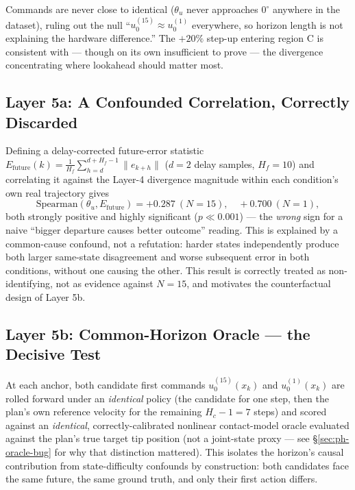 \documentclass[journal]{IEEEtran}
\begin{document}
Commands are never close to identical ($\theta_u$ never approaches
$0^{\circ}$ anywhere in the dataset), ruling out the null
``$u_0^{(15)}\approx u_0^{(1)}$ everywhere, so horizon length is not
explaining the hardware difference.'' The $+20\%$ step-up entering
region C is consistent with --- though on its own insufficient to
prove --- the divergence concentrating where lookahead should matter
most.

\subsection{Layer 5a: A Confounded Correlation, Correctly Discarded}
\label{sec:ph-5a}

Defining a delay-corrected future-error statistic
$E_{\mathrm{future}}(k) = \tfrac{1}{H_f}\sum_{h=d}^{d+H_f-1}\|e_{k+h}\|$
($d{=}2$ delay samples, $H_f{=}10$) and correlating it against the
Layer-4 divergence magnitude within each condition's own real
trajectory gives
\begin{equation}
\mathrm{Spearman}(\theta_u, E_{\mathrm{future}}) = +0.287\ (N{=}15),
\quad +0.700\ (N{=}1),
\end{equation}
both strongly positive and highly significant ($p\ll 0.001$) --- the
\emph{wrong} sign for a naive ``bigger departure causes better
outcome'' reading. This is explained by a common-cause confound,
not a refutation: harder states independently produce both larger
same-state disagreement and worse subsequent error in both
conditions, without one causing the other. This result is correctly
treated as non-identifying, not as evidence against $N{=}15$, and
motivates the counterfactual design of Layer 5b.

\subsection{Layer 5b: Common-Horizon Oracle --- the Decisive Test}
\label{sec:ph-5b}

At each anchor, both candidate first commands $u_0^{(15)}(x_k)$ and
$u_0^{(1)}(x_k)$ are rolled forward under an \emph{identical} policy
(the candidate for one step, then the plan's own reference velocity
for the remaining $H_c{-}1{=}7$ steps) and scored against an
\emph{identical}, correctly-calibrated nonlinear contact-model oracle
evaluated against the plan's true target tip position (not a
joint-state proxy --- see \S\ref{sec:ph-oracle-bug} for why that
distinction mattered). This isolates the horizon's causal contribution
from state-difficulty confounds by construction: both candidates face
the same future, the same ground truth, and only their first action
differs.
\end{document}
